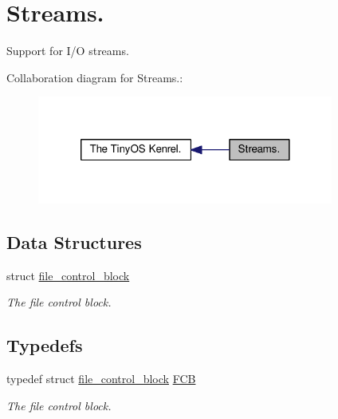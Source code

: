 \hypertarget{group__streams}{\section{Streams.}
\label{group__streams}
}


Support for I/\-O streams.  


Collaboration diagram for Streams.\-:
\nopagebreak
\begin{figure}[H]
\begin{center}
\leavevmode
\includegraphics[width=276pt]{group__streams}
\end{center}
\end{figure}
\subsection*{Data Structures}
\begin{DoxyCompactItemize}
\item 
struct \hyperlink{structfile__control__block}{file\-\_\-control\-\_\-block}
\begin{DoxyCompactList}\small\item\em The file control block. \end{DoxyCompactList}\end{DoxyCompactItemize}
\subsection*{Typedefs}
\begin{DoxyCompactItemize}
\item 
typedef struct \hyperlink{structfile__control__block}{file\-\_\-control\-\_\-block} \hyperlink{group__streams_ga0c7e751afb9d6cadebf070961804d400}{F\-C\-B}
\begin{DoxyCompactList}\small\item\em The file control block. \end{DoxyCompactList}\end{DoxyCompactItemize}
